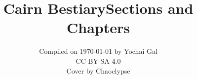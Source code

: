 \documentclass[
  10pt,
  american,
]{extbook}
\title{Cairn Bestiary}
\subtitle{Compiled on {\today} by Yochai Gal \\ CC-BY-SA 4.0 \\ Cover by Chaoclypse}
\date{}
\begin{document}
\begin{minipage}{\textwidth}
\AtBeginShipoutNext{\AtBeginShipoutDiscard}

\end{minipage}
\AtEndDocument{}
\maketitle
\thispagestyle{empty}
\AtBeginShipoutNext{\AtBeginShipoutDiscard}
\let\oldtoc\tableofcontents
\renewcommand{\contentsname}{\centering Creatures from A to Z}
\title{Sections and Chapters}
\renewcommand{\tableofcontents}{\oldtoc\newpage}
{
\pagestyle{empty}
\begin{multicols}{2}
\tableofcontents
\end{multicols}
}
\clearpage
{} 
\setcounter{page}{5}
\shipout\null

\end{document}

